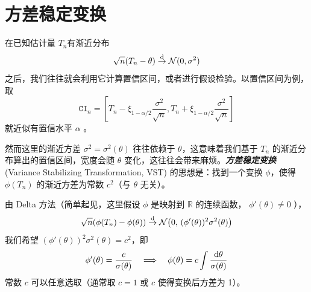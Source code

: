 \section{方差稳定变换}

在已知估计量 $T_n$有渐近分布 \[ \sqrt n(T_n-\theta)\overset{\rm d}\to \mathcal N(0,\sigma^2) \]之后，我们往往就会利用它计算置信区间，或者进行假设检验。以置信区间为例，取 \[ \texttt{CI}_n=\left[T_n-\xi_{1-\alpha/2}\frac{\sigma^2}{\sqrt n},T_n+\xi_{1-\alpha/2}\frac{\sigma^2}{\sqrt n}\right] \]就近似有置信水平 $\alpha$ 。

然而这里的渐近方差 $\sigma^2=\sigma^2(\theta)$ 往往依赖于 $\theta$，这意味着我们基于 $T_n$ 的渐近分布算出的置信区间，宽度会随 $\theta$ 变化，这往往会带来麻烦。\textbf{\emph{方差稳定变换 }} (Variance Stabilizing Transformation, VST) 的思想是：找到一个变换 $\phi$，使得 $\phi(T_n)$ 的渐近方差为常数 $c^2$（与 $\theta$ 无关）。

由 Delta 方法（简单起见，这里假设 $\phi$ 是映射到 $\mathbb R$ 的连续函数， $\phi'(\theta)\ne 0$ ），
\[\sqrt{n}(\phi(T_n)-\phi(\theta)) \overset{\rm d}\to \mathcal{N}\bigl(0,\,(\phi'(\theta))^2\sigma^2(\theta)\bigr)\]
我们希望 $(\phi'(\theta))^2\sigma^2(\theta)=c^2$，即
\[\phi'(\theta) = \frac{c}{\sigma(\theta)} \quad \Longrightarrow \quad \phi(\theta) = c\int \frac{{\rm d}\theta}{\sigma(\theta)}\]
常数 $c$ 可以任意选取（通常取 $c=1$ 或 $c$ 使得变换后方差为 1）。

